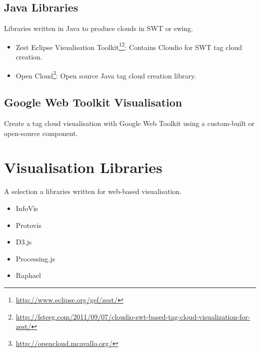 \subsection{Java Libraries}  

Libraries written in Java to produce clouds in SWT or swing. 

\begin{itemize}
	
	\item Zest Eclipse Visualisation Toolkit\footnote{\url{http://www.eclipse.org/gef/zest/}}\footnote{ \url{http://fsteeg.com/2011/09/07/cloudio-swt-based-tag-cloud-visualization-for-zest/}}: Contains Cloudio for SWT tag cloud creation.

	\item Open Cloud\footnote{\url{http://opencloud.mcavallo.org/}}: Open source Java tag cloud creation library. 

\end{itemize}

\subsection{Google Web Toolkit Visualisation}

Create a tag cloud visualisation with Google Web Toolkit using a custom-built or open-source component. 

\section{Visualisation Libraries}

A selection a libraries written for web-based visualisation. 

\begin{itemize}
		\item InfoVis
		\item Protovis
		\item D3.js
		\item Processing.js
		\item Raphael
\end{itemize}


